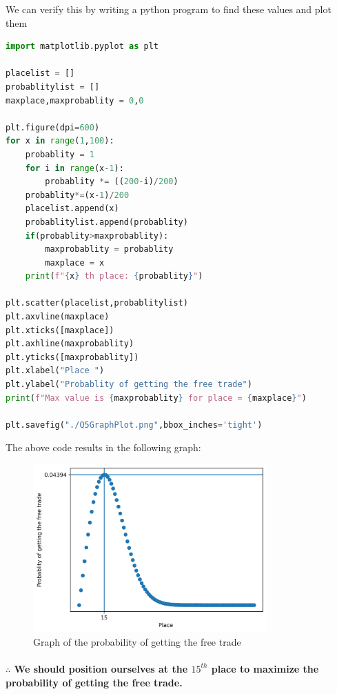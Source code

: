 We can verify this by writing a python program to find these values and plot them\\
\begin{lstlisting}[language=Python, caption={Python code to calculate the probability}]
import matplotlib.pyplot as plt

placelist = []
probablitylist = []
maxplace,maxprobablity = 0,0

plt.figure(dpi=600)
for x in range(1,100):
    probablity = 1
    for i in range(x-1):
        probablity *= ((200-i)/200)
    probablity*=(x-1)/200
    placelist.append(x)
    probablitylist.append(probablity)
    if(probablity>maxprobablity):
        maxprobablity = probablity
        maxplace = x
    print(f"{x} th place: {probablity}")

plt.scatter(placelist,probablitylist)
plt.axvline(maxplace)
plt.xticks([maxplace])
plt.axhline(maxprobablity)
plt.yticks([maxprobablity])
plt.xlabel("Place ")
plt.ylabel("Probablity of getting the free trade")
print(f"Max value is {maxprobablity} for place = {maxplace}")

plt.savefig("./Q5GraphPlot.png",bbox_inches='tight')
\end{lstlisting}


The above code results in the following graph:
\begin{figure}[h]
	\centering
	\includegraphics[width=0.8\textwidth]{img/Q5 Graph Plot.png}
	\caption{Graph of the probability of getting the free trade}
\end{figure}

\paragraph{$\therefore$ We should position ourselves at the \(15^{th}\) place to maximize the probability of getting the free trade.}

